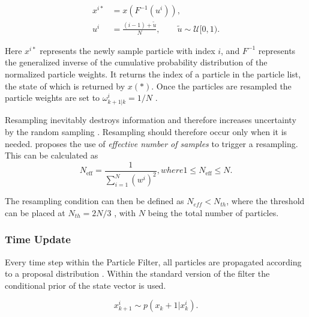 \begin{align}
	x^{i*} &= x(F^{-1}(u^i)), \\
	u^i &= \frac{(i-1) + \tilde{u}}{N}, \qquad \tilde{u} \sim \mathcal{U}[0,1).
\end{align}	

Here $x^{i*}$ represents the newly sample particle with index $i$, and $F^{-1}$ represents the generalized inverse of the cumulative probability distribution of the normalized particle weights. It returns the index of a particle in the particle list, the state of which is returned by $x(*)$. Once the particles are resampled the particle weights are set to $\omega^i_{k+1|k} = 1/N$ . \par
Resampling inevitably destroys information and therefore increases uncertainty by the random sampling \cite{gustafsson2010particle}. Resampling should therefore occur only when it is needed. \citet{gustafsson2010statistical} proposes the use of  \textit{effective number of samples} to trigger a  resampling. This can be calculated as 
\begin{subequations}
	\begin{equation}
		N_{\mathrm{eff}}=\frac{1}{\sum_{i=1}^{N}\left(w^{i}\right)^{2}},
	\end{equation}
	
	where
	
	\begin{equation}
		1 \leq N_{\mathrm{eff}} \leq N.
	\end{equation}
\end{subequations}

The resampling condition can then be defined as $N_{eff} < N_{th}$, where the threshold can be placed at $N_{th} = 2N/3$ \cite{gustafsson2010statistical}, with $N$ being the total number of particles. \par 

\subsubsection{Time Update}
Every time step within the Particle Filter, all particles are propagated according to a proposal distribution \cite{gustafsson2010particle}. Within the standard version of the filter the conditional prior of the state vector is used. 

\begin{equation}
	x_{k+1}^{i} \sim p(x_k+1|x^i_{k}).
\end{equation}


